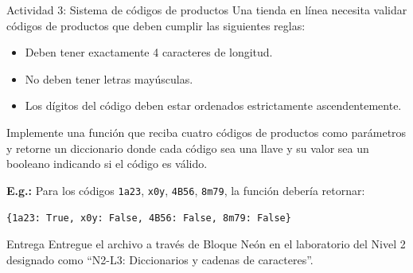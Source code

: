 \documentclass{ip-lab}
\begin{document}
\begin{sectionbox}{Actividad 3: Sistema de códigos de productos}
Una tienda en línea necesita validar códigos de productos que deben cumplir las siguientes reglas:
\begin{itemize}
  \item Deben tener exactamente 4 caracteres de longitud.
  \item No deben tener letras mayúsculas.
  \item Los dígitos del código deben estar ordenados estrictamente ascendentemente.
\end{itemize}

Implemente una función que reciba cuatro códigos de productos como parámetros y retorne un diccionario donde cada código sea una llave y su valor sea un booleano indicando si el código es válido.

\textbf{E.g.:} Para los códigos \texttt{\textquotedbl 1a23\textquotedbl}, \texttt{\textquotedbl x0y\textquotedbl}, \texttt{\textquotedbl 4B56\textquotedbl}, \texttt{\textquotedbl 8m79\textquotedbl}, la función debería retornar:

\texttt{\{\textquotedbl 1a23\textquotedbl: True, \textquotedbl x0y\textquotedbl: False, \textquotedbl 4B56\textquotedbl: False, \textquotedbl 8m79\textquotedbl: False\}}
\end{sectionbox}

\begin{sectionbox}{Entrega}
Entregue el archivo a través de Bloque Neón en el laboratorio del Nivel 2 designado como ``N2-L3: Diccionarios y cadenas de caracteres''.
\end{sectionbox}
\end{document}
